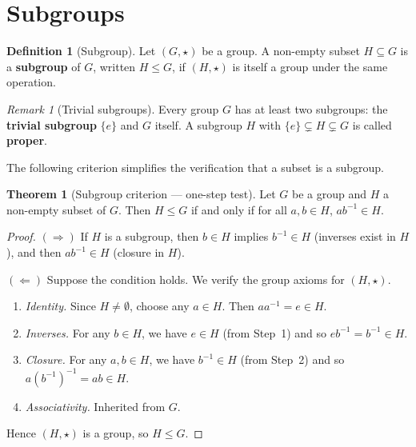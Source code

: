 \documentclass[12pt,a4paper,openany]{book}
\theoremstyle{definition}
\newtheorem{definition}{Definition}[chapter]
\newtheorem{theorem}{Theorem}[chapter]
\theoremstyle{remark}
\newtheorem{remark}{Remark}[chapter]
\begin{document}
\section{Subgroups}
\label{sec:ch2-subgroups}

\begin{definition}[Subgroup]
\label{def:subgroup}
Let $(G,\star)$ be a group.  A non-empty subset $H\subseteq G$ is a
\textbf{subgroup} of $G$, written $H\le G$, if
$(H,\star)$ is itself a group under the same operation.
\end{definition}

\begin{remark}[Trivial subgroups]
\label{rem:trivial-subgroups}
Every group $G$ has at least two subgroups: the \textbf{trivial subgroup}
$\{e\}$ and $G$ itself.  A subgroup $H$ with $\{e\}\subsetneq H\subsetneq
G$ is called \textbf{proper}.
\end{remark}

The following criterion simplifies the verification that a subset is a
subgroup.

\begin{theorem}[Subgroup criterion --- one-step test]
\label{thm:subgroup-criterion}
Let $G$ be a group and $H$ a non-empty subset of $G$.  Then $H\le G$ if and
only if for all $a,b\in H$, $ab^{-1}\in H$.
\end{theorem}

\begin{proof}
$(\Rightarrow)$ If $H$ is a subgroup, then $b\in H$ implies $b^{-1}\in H$
(inverses exist in $H$), and then $ab^{-1}\in H$ (closure in $H$).

$(\Leftarrow)$ Suppose the condition holds.  We verify the group axioms for
$(H,\star)$.

\begin{enumerate}[label=\textit{Step \arabic*.}, leftmargin=3em]
  \item \textit{Identity.}  Since $H\neq\emptyset$, choose any $a\in H$.
    Then $aa^{-1}=e\in H$.
  \item \textit{Inverses.}  For any $b\in H$, we have $e\in H$ (from Step~1)
    and so $eb^{-1}=b^{-1}\in H$.
  \item \textit{Closure.}  For any $a,b\in H$, we have $b^{-1}\in H$ (from
    Step~2) and so $a(b^{-1})^{-1}=ab\in H$.
  \item \textit{Associativity.}  Inherited from $G$.
\end{enumerate}
Hence $(H,\star)$ is a group, so $H\le G$.
\end{proof}
\end{document}
